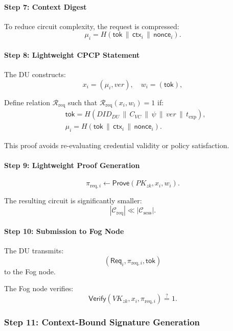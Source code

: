 \documentclass[conference]{IEEEtran}
\begin{document}
\paragraph*{\textbf{Step 7: Context Digest}}

To reduce circuit complexity, the request is compressed:
\[
\mu_i = H(\mathsf{tok} \,\|\, \mathsf{ctx}_i \,\|\, \mathsf{nonce}_i).
\]

\paragraph*{\textbf{Step 8: Lightweight CPCP Statement}}

The DU constructs:
\[
x_i = (\mu_i, ver),
\quad
w_i = (\mathsf{tok}),
\]

Define relation $\mathcal{R}_{\mathrm{req}}$ such that $\mathcal{R}_{\mathrm{req}}(x_i, w_i)=1$ if:
\begin{align}
&\mathsf{tok} = H(DID_{DU} \,\|\, C_{VC} \,\|\, \psi \,\|\, ver \,\|\, t_{\mathrm{exp}}), \\
&\mu_i = H(\mathsf{tok} \,\|\, \mathsf{ctx}_i \,\|\, \mathsf{nonce}_i).
\end{align}

This proof avoids re-evaluating credential validity or policy satisfaction.

\paragraph*{\textbf{Step 9: Lightweight Proof Generation}}

\[
\pi_{\mathrm{req},i} \leftarrow \textsf{Prove}(PK_{zk}, x_i, w_i).
\]

The resulting circuit is significantly smaller:
\[
|\mathcal{C}_{\mathrm{req}}| \ll |\mathcal{C}_{\mathrm{sess}}|.
\]

\paragraph*{\textbf{Step 10: Submission to Fog Node}}

The DU transmits:
\[
(\mathsf{Req}_i, \pi_{\mathrm{req},i}, \mathsf{tok})
\]
to the Fog node.

The Fog node verifies:
\[
\textsf{Verify}(VK_{zk}, x_i, \pi_{\mathrm{req},i}) \stackrel{?}{=} 1.
\]

\medskip

\subsubsection*{Step 11: Context-Bound Signature Generation}
\end{document}
